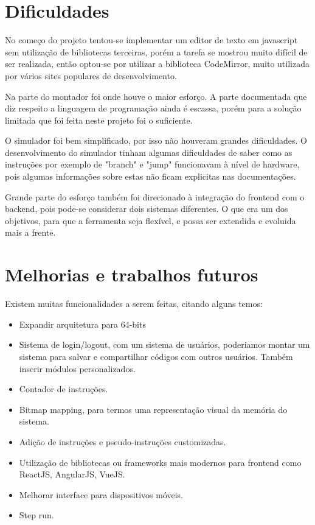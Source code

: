\section{Dificuldades}

	No começo do projeto tentou-se implementar um editor de texto em javascript sem utilização de bibliotecas terceiras, porém a tarefa se mostrou muito difícil de ser realizada, então optou-se por utilizar a biblioteca CodeMirror, muito utilizada por vários sites populares de desenvolvimento.

	Na parte do montador foi onde houve o maior esforço. A parte documentada que diz respeito a linguagem de programação ainda é escassa, porém para a solução limitada que foi feita neste projeto foi o suficiente.

	O simulador foi bem simplificado, por isso não houveram grandes dificuldades. O desenvolvimento do simulador tinham algumas dificuldades de saber como as instruções por exemplo de "branch" e "jump" funcionavam à nível de hardware, pois algumas informações sobre estas não ficam explicitas nas documentações.

	Grande parte do esforço também foi direcionado à integração do frontend com o backend, pois pode-se considerar dois sistemas diferentes. O que era um dos objetivos, para que a ferramenta seja flexível, e possa ser extendida e evoluida mais a frente.

\section{Melhorias e trabalhos futuros}

	Existem muitas funcionalidades a serem feitas, citando alguns temos:

	\begin{itemize}
		\item Expandir arquitetura para 64-bits
		\item Sistema de login/logout, com um sistema de usuários, poderiamos montar um sistema para salvar e compartilhar códigos com outros usuários. Também inserir módulos personalizados.
		\item Contador de instruções.
		\item Bitmap mapping, para termos uma representação visual da memória do sistema.
		\item Adição de instruções e pseudo-instruções customizadas.
		\item Utilização de bibliotecas ou frameworks mais modernos para frontend como ReactJS, AngularJS, VueJS.
		\item Melhorar interface para dispositivos móveis.
		\item Step run.
	\end{itemize}

